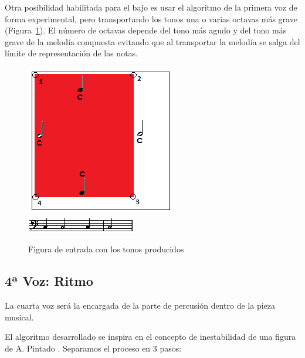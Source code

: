 Otra posibilidad habilitada para el bajo es usar el algoritmo de la primera voz de forma experimental, pero transportando los tonos una o varias octavas más grave (Figura~\ref{fig:Figura2Voz3}). El número de octavas depende del tono más agudo y del tono más grave de la melodía compuesta evitando que al transportar la melodía se salga del límite de representación de las notas.

		\begin{figure}[!htbp]
		\centering
		\hspace*{0.0in}
		\includegraphics[scale=1]{graphics/simpletest2-F2F3_2.png}
		\includegraphics[scale=1]{graphics/simpletest3_2-BASSpartitura.png}
		\caption{Figura de entrada con los tonos producidos}
		\label{fig:Figura2Voz3}
		\end{figure}


\subsection{4ª Voz: Ritmo}

La cuarta voz será la encargada de la parte de percusión dentro de la pieza musical.

El algoritmo desarrollado se inspira en el concepto de inestabilidad de una figura de A. Pintado \cite{portutesis}. Separamos el proceso en 3 pasos:

